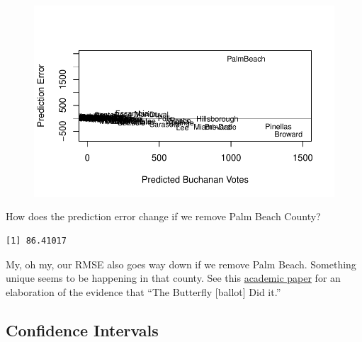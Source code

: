 \documentclass[
  letterpaper,
  DIV=11,
  numbers=noendperiod]{scrreprt}
\newenvironment{Shaded}{\begin{snugshade}}{\end{snugshade}}
\newcommand{\AttributeTok}[1]{\textcolor[rgb]{0.40,0.45,0.13}{#1}}
\newcommand{\DecValTok}[1]{\textcolor[rgb]{0.68,0.00,0.00}{#1}}
\newcommand{\FunctionTok}[1]{\textcolor[rgb]{0.28,0.35,0.67}{#1}}
\newcommand{\NormalTok}[1]{\textcolor[rgb]{0.00,0.23,0.31}{#1}}
\newcommand{\OtherTok}[1]{\textcolor[rgb]{0.00,0.23,0.31}{#1}}
\newcommand{\SpecialCharTok}[1]{\textcolor[rgb]{0.37,0.37,0.37}{#1}}
\newcommand{\StringTok}[1]{\textcolor[rgb]{0.13,0.47,0.30}{#1}}
\begin{document}
\begin{figure}[H]

{\centering \includegraphics{08-Regression_files/figure-pdf/unnamed-chunk-36-1.pdf}

}

\end{figure}

How does the prediction error change if we remove Palm Beach County?

\begin{Shaded}
\end{Shaded}

\begin{verbatim}
[1] 86.41017
\end{verbatim}

My, oh my, our RMSE also goes way down if we remove Palm Beach.
Something unique seems to be happening in that county. See this
\href{http://sekhon.berkeley.edu/papers/butterfly.pdf}{academic paper}
for an elaboration of the evidence that ``The Butterfly {[}ballot{]} Did
it.''

\hypertarget{confidence-intervals}{%
\subsection{Confidence Intervals}\label{confidence-intervals}}
\end{document}
